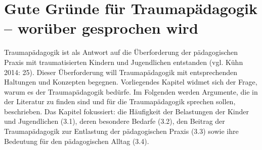 \section{Gute Gründe für Traumap{\"a}dagogik – worüber gesprochen wird}

Traumapädagogik ist als Antwort auf die Überforderung der pädagogischen Praxis mit traumatisierten Kindern und Jugendlichen entstanden (vgl. Kühn 2014: 25). Dieser Überforderung will Traumapädagogik mit entsprechenden Haltungen und Konzepten begegnen. Vorliegendes Kapitel widmet sich der Frage, warum es der Traumapädagogik bedürfe. Im Folgenden werden Argumente, die in der Literatur zu finden sind und für die Traumapädagogik sprechen sollen, beschrieben. Das Kapitel fokussiert: die Häufigkeit der Belastungen der Kinder und Jugendlichen (3.1), deren besondere Bedarfe (3.2), den Beitrag der Traumapädagogik zur Entlastung der pädagogischen Praxis (3.3) sowie ihre Bedeutung für den pädagogischen Alltag (3.4).

